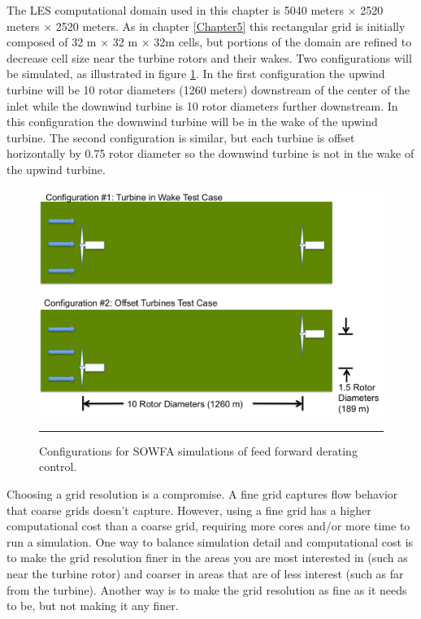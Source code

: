 The LES computational domain used in this chapter is 5040 meters $\times$ 2520 meters $\times$ 2520 meters. As in chapter \ref{Chapter5} this rectangular grid is initially composed of 32 m $\times$ 32 m $\times$ 32m cells, but portions of the domain are refined to decrease cell size near the turbine rotors and their wakes. Two configurations will be simulated, as illustrated in figure \ref{fig6-1}. In the first configuration the upwind turbine will be 10 rotor diameters (1260 meters) downstream of the center of the inlet while the downwind turbine is 10 rotor diameters further downstream. In this configuration the downwind turbine will be in the wake of the upwind turbine. The second configuration is similar, but each turbine is offset horizontally by 0.75 rotor diameter so the downwind turbine is not in the wake of the upwind turbine. 

\begin{figure}[htbp]	\label{fig6-1}
	\centering
		\includegraphics[width = \linewidth]{Figures/ch6Figures/fig6-1.png}
		\rule{35em}{0.5pt}
	\caption{Configurations for SOWFA simulations of feed forward derating control.}
\end{figure}

Choosing a grid resolution is a compromise. A fine grid captures flow behavior that coarse grids doesn't capture. However, using a fine grid has a higher computational cost than a coarse grid, requiring more cores and/or more time to run a simulation. One way to balance simulation detail and computational cost is to make the grid resolution finer in the areas you are most interested in (such as near the turbine rotor) and coarser in areas that are of less interest (such as far from the turbine). Another way is to make the grid resolution as fine as it needs to be, but not making it any finer. 

